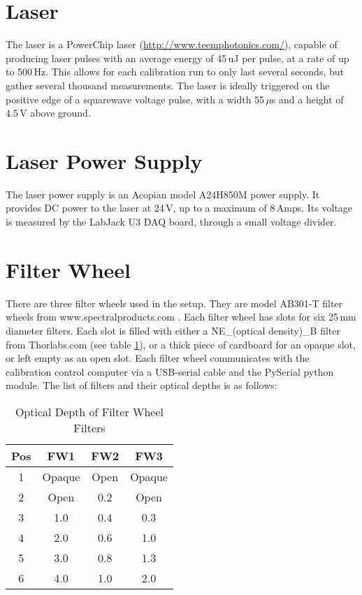 \section{Laser}
The laser is a PowerChip laser (\url{http://www.teemphotonics.com/}), capable of producing laser pulses with an average energy of 45$\,$uJ per pulse, at a rate of up to 500$\,$Hz.  This allows for each calibration run to only last several seconds, but gather several thousand measurements.  The laser is ideally triggered on the positive edge of a squarewave voltage pulse, with a width 55$\,\mu$s and a height of 4.5$\,$V above ground.

\section{Laser Power Supply}
The laser power supply is an Acopian model A24H850M power supply.
It provides DC power to the laser at 24$\,$V, up to a maximum of 8$\,$Amps.
Its voltage is measured by the LabJack U3 DAQ board, through a small voltage divider.

\section{Filter Wheel}
There are three filter wheels used in the setup.
They are model AB301-T filter wheels from www.spectralproducts.com .  
Each filter wheel has slots for six 25$\,$mm diameter filters.
Each slot is filled with either a NE\_(optical density)\_B filter from Thorlabs.com (see table \ref{tab:fwfilters}), or a thick piece of cardboard for an opaque slot, or left empty as an open slot.
Each filter wheel communicates with the calibration control computer via a USB-serial cable and the PySerial python module.
The list of filters and their optical depths is as follows:

\begin{table}[h]
\begin{center}
\begin{tabular}{ c | c | c | c }    
  Pos & FW1 & FW2 & FW3 \\ \hline
  1 & Opaque & Open & Opaque \\
  2 & Open & 0.2 & Open \\
  3 & 1.0 & 0.4 & 0.3 \\
  4 & 2.0 & 0.6 & 1.0 \\
  5 & 3.0 & 0.8 & 1.3 \\
  6 & 4.0 & 1.0 & 2.0 \\
\end{tabular}
\caption{Optical Depth of Filter Wheel Filters}
\label{tab:fwfilters}
\end{center}
\end{table}



